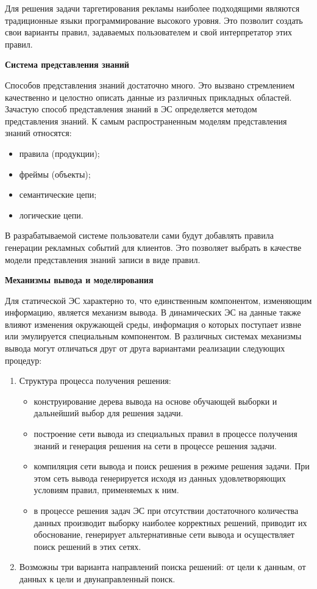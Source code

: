 Для решения задачи таргетирования рекламы наиболее подходящими являются традиционные языки программирование высокого уровня. Это позволит создать свои варианты правил, задаваемых пользователем и свой интерпретатор этих правил.

\textbf{Система представления знаний}

Способов представления знаний достаточно много. Это вызвано стремлением качественно и целостно описать данные из различных прикладных областей. Зачастую способ представления знаний в ЭС определяется методом представления знаний. К самым распространенным моделям представления знаний относятся:

\begin{itemize}
\item правила (продукции);
\item фреймы (объекты);
\item семантические цепи;
\item логические цепи.
\end{itemize}

В разрабатываемой системе пользователи сами будут добавлять правила генерации рекламных событий для клиентов. Это позволяет выбрать в качестве модели представления знаний записи в виде правил.

\textbf{Механизмы вывода и моделирования}

Для статической ЭС характерно то, что единственным компонентом, изменяющим информацию, является механизм вывода. В динамических ЭС на данные также влияют изменения окружающей среды, информация о которых поступает извне или эмулируется специальным компонентом. В различных системах механизмы вывода могут отличаться друг от друга вариантами реализации следующих процедур:

\begin{enumerate}
	\item Структура процесса получения решения:
	\begin{itemize}
		\item конструирование дерева вывода на основе обучающей выборки и дальнейший выбор для решения задачи.
		\item построение сети вывода из специальных правил в процессе получения знаний и генерация решения на сети в процессе решения задачи.
		\item компиляция сети вывода и поиск решения в режиме решения задачи. При этом сеть вывода генерируется исходя из данных удовлетворяющих условиям правил, применяемых к ним.
		\item в процессе решения задач ЭС при отсутствии достаточного количества данных производит выборку наиболее корректных решений, приводит их обоснование, генерирует альтернативные сети вывода и осуществляет поиск решений в этих сетях.
	\end{itemize}

	\item Возможны три варианта направлений поиска решений: от цели к данным, от данных к цели и двунаправленный поиск.
\end{enumerate}

